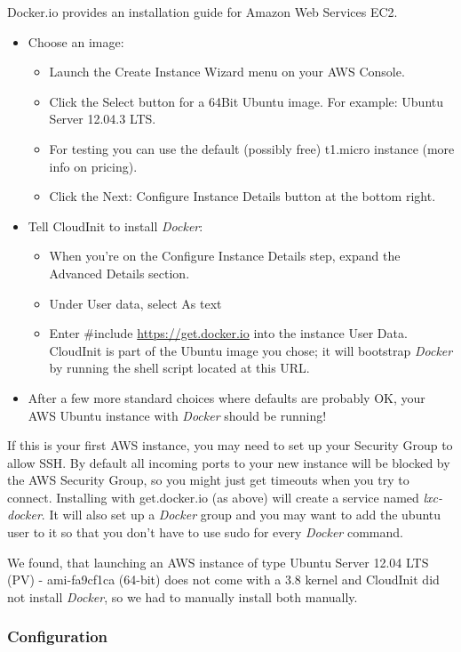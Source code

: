 \documentclass[11pt]{article}
\begin{document}
Docker.io provides an installation guide for Amazon Web Services EC2.
\begin{itemize}
\item Choose an image:
\begin{itemize}
\item Launch the Create Instance Wizard menu on your AWS Console.
\item Click the Select button for a 64Bit Ubuntu image. For example: Ubuntu Server 12.04.3 LTS.
\item For testing you can use the default (possibly free) t1.micro instance (more info on pricing).
\item Click the Next: Configure Instance Details button at the bottom right.
\end{itemize}
\item Tell CloudInit to install \emph{Docker}:
\begin{itemize}
\item When you're on the Configure Instance Details step, expand the Advanced Details section.
\item Under User data, select As text
\item Enter \#include \href{https://get.docker.io}{https://get.docker.io}  into the instance User Data. CloudInit is part of the Ubuntu image you chose; it will bootstrap \emph{Docker} by running the shell script located at this URL.
\end{itemize}
\item After a few more standard choices where defaults are probably OK, your AWS Ubuntu instance with \emph{Docker} should be running!
\end{itemize}
If this is your first AWS instance, you may need to set up your Security Group to allow SSH. By default all incoming ports to your new instance will be blocked by the AWS Security Group, so you might just get
timeouts when you try to connect. Installing with get.docker.io (as above) will create a service named \emph{lxc-docker}. It will also set up a \emph{Docker} group and you may want to add the ubuntu user to it so that you don't have to use sudo for every \emph{Docker} command. 

We found, that launching an AWS instance of type Ubuntu Server 12.04 LTS (PV) - ami-fa9cf1ca (64-bit) does not come with a 3.8 kernel and CloudInit did not install \emph{Docker}, so we had to manually install both manually.   
\subsubsection{Configuration}
\label{sec-2-1-5}
\end{document}
